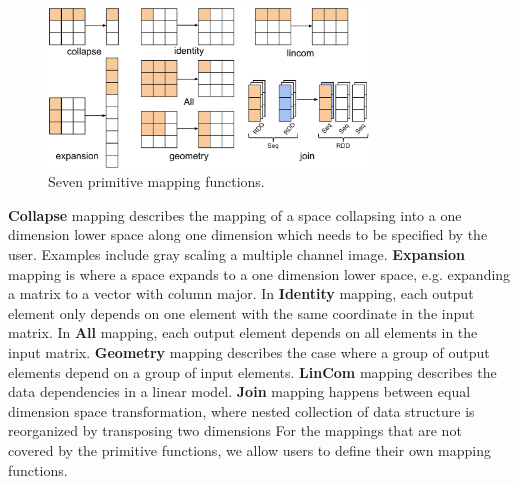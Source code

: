 \documentclass{sig-alternate}
\begin{document}
\begin{figure}[h]
\begin{center}
    \includegraphics[width=85mm]{pictures/narrowmapping}
\caption {Seven primitive mapping functions.
    \label{fig:narrowmapping}
}
\end{center}
\end{figure}


{\bf Collapse} mapping describes the mapping of a space collapsing into a one dimension lower space along one dimension which needs
to be specified by the user. Examples include gray scaling a multiple channel image.
{\bf Expansion} mapping is where a space expands to a one dimension lower space, e.g. expanding a matrix to a vector with column major.
In {\bf Identity} mapping, each output element only depends on one element with the same coordinate in the input matrix.
In {\bf All} mapping, each output element depends on all elements in the input matrix.
{\bf Geometry} mapping describes the case where a group of output elements depend on a group of input elements.
{\bf LinCom} mapping describes the data dependencies in a linear model.
{\bf Join} mapping happens between equal dimension space transformation, where nested collection of data structure is reorganized by 
transposing two dimensions
For the mappings that are not covered by the primitive functions, we allow users to define their own mapping functions.


\end{document}
